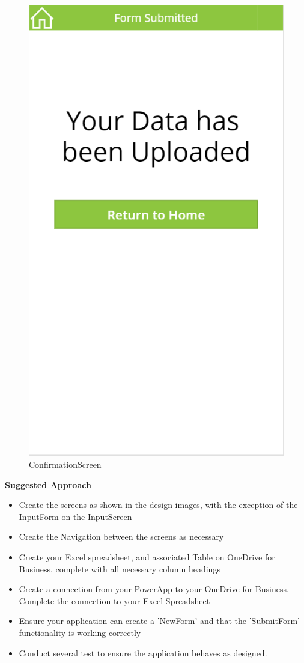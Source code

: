 \begin{figure}[th]
	\centering
	\includegraphics[width=0.7\linewidth]{img/ConfirmationScreen}
	\caption[ConfirmationScreen]{ConfirmationScreen}
	\label{fig:confirmationscreen}
\end{figure}




\vspace{.5cm}

\textbf{Suggested Approach}

\begin{itemize}
	\item Create the screens as shown in the design images, with the exception of the InputForm on the InputScreen
	\item Create the Navigation between the screens as necessary
	\item Create your Excel spreadsheet, and associated Table on OneDrive for Business, complete with all necessary column headings
	\item Create a connection from your PowerApp to your OneDrive for Business.  Complete the connection to your Excel Spreadsheet
	\item Ensure your application can create a 'NewForm' and that the 'SubmitForm' functionality is working correctly
	\item Conduct several test to ensure the application behaves as designed.
\end{itemize}


